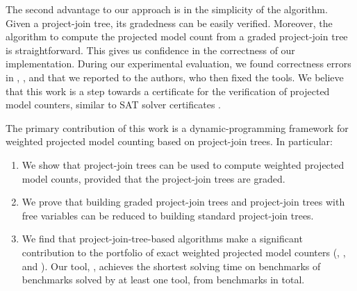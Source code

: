 The second advantage to our approach is in the simplicity of the algorithm. Given a project-join tree, its gradedness can be easily verified. 
Moreover, the algorithm to compute the projected model count from a graded project-join tree is straightforward. This gives us confidence in the correctness of our implementation. 
During our experimental evaluation, we found correctness errors in \dfp{} \cite{lagniez2019recursive}, \projmc{} \cite{lagniez2019recursive}, and \ssat{} \cite{lee2017solving} that we reported to the authors, who then fixed the tools. 
We believe that this work is a step towards a certificate for the verification of projected model counters, similar to SAT solver certificates \cite{wetzler2014drat}.

The primary contribution of this work is a dynamic-programming framework for weighted projected model counting based on project-join trees. In particular:
\begin{enumerate}
    \item We show that project-join trees can be used to compute weighted projected model counts, provided that the project-join trees are graded.
    \item We prove that building graded project-join trees and project-join trees with free variables can be reduced to building standard project-join trees.
    \item We find that project-join-tree-based algorithms make a significant contribution to the portfolio of exact weighted projected model counters (\dfp{}, \projmc{}, and \ssat{}).
    Our tool, \procount{}, achieves the shortest solving time on \dpmcFastestBenchmarks{} benchmarks of \solvedBenchmarks{} benchmarks solved by at least one tool, from \benchmarks{} benchmarks in total.
\end{enumerate}